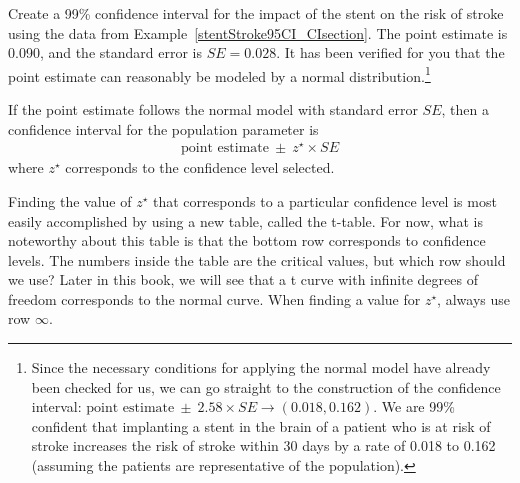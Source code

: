 
\begin{exercise} \label{find99CIForRun10AgeExercise}
Create a 99\% confidence interval for the impact of the stent on the risk of stroke using the data from Example~\ref{stentStroke95CI_CIsection}. The point estimate is 0.090, and the standard error is $SE = 0.028$. It has been verified for you that the point estimate can reasonably be modeled by a normal distribution.\footnote{Since the necessary conditions for applying the normal model have already been checked for us, we can go straight to the construction of the confidence interval: $\text{point estimate}\ \pm\ 2.58 \times  SE \rightarrow (0.018, 0.162)$. We are 99\% confident that implanting a stent in the brain of a patient who is at risk of stroke increases the risk of stroke within 30 days by a rate of 0.018 to 0.162 (assuming the patients are representative of the population).}
\end{exercise}


\begin{termBox}{
If the point estimate follows the normal model with standard error $SE$, then a confidence interval for the population parameter is
\begin{eqnarray*}
\text{point estimate}\ \pm\ z^{\star} \times SE
\end{eqnarray*}
where $z^{\star}$ corresponds to the confidence level selected.}
\end{termBox}

Finding the value of $z^{\star}$ that corresponds to a particular confidence level is most easily accomplished by using a new table, called the t-table.  For now, what is noteworthy about this table is that the bottom row corresponds to confidence levels.  The numbers inside the table are the critical values, but which row should we use?  Later in this book, we will see that a t curve with infinite degrees of freedom corresponds to the normal curve.  When finding a value for $z^{\star}$, always use row $\infty$.  

